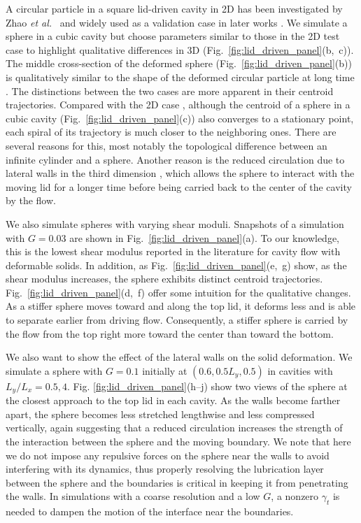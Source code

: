 \documentclass[times, 10pt]{article}
\begin{document}
\begin{multicols}{2}
A circular particle in a square lid-driven cavity in 2D has been investigated by Zhao \textit{et al.}~\cite{zhao08} and widely used as a validation case in later works \cite{sugiyama11, esmailzadeh14, farahbakhsh16, casquero18}.
We simulate a sphere in a cubic cavity but choose parameters similar to those in the 2D test case to highlight qualitative differences in 3D (Fig.~\ref{fig:lid_driven_panel}(b,~c)).
The middle cross-section of the deformed sphere (Fig.~\ref{fig:lid_driven_panel}(b)) is qualitatively similar to the shape of the deformed circular particle at long time \cite{casquero18}.
The distinctions between the two cases are more apparent in their centroid trajectories.
Compared with the 2D case \cite{sugiyama11}, although the centroid of a sphere in a cubic cavity (Fig.~\ref{fig:lid_driven_panel}(c)) also converges to a stationary point, each spiral of its trajectory is much closer to the neighboring ones.
There are several reasons for this, most notably the topological difference between an infinite cylinder and a sphere.
Another reason is the reduced circulation due to lateral walls in the third dimension \cite{gelfgat19},
which allows the sphere to interact with the moving lid for a longer time before being carried back to the center of the cavity by the flow.

We also simulate spheres with varying shear moduli.
Snapshots of a simulation with $G=0.03$ are shown in Fig.~\ref{fig:lid_driven_panel}(a).
To our knowledge, this is the lowest shear modulus reported in the literature for cavity flow with deformable solids.
In addition, as Fig.~\ref{fig:lid_driven_panel}(e,~g) show,
as the shear modulus increases, the sphere exhibits distinct centroid trajectories.
Fig.~\ref{fig:lid_driven_panel}(d,~f) offer some intuition for the qualitative changes.
As a stiffer sphere moves toward and along the top lid,
it deforms less and is able to separate earlier from driving flow.
Consequently, a stiffer sphere is carried by the flow from the top right more toward the center than toward the bottom.

We also want to show the effect of the lateral walls on the solid deformation.
We simulate a sphere with $G=0.1$ initially at $(0.6, 0.5L_y, 0.5)$ in cavities with $L_y/L_x=0.5, 4$.
Fig. \ref{fig:lid_driven_panel}(h--j) show two views of the sphere at the closest approach to the top lid in each cavity.
As the walls become farther apart, the sphere becomes less stretched lengthwise and less compressed vertically,
again suggesting that a reduced circulation increases the strength of the interaction between the sphere and the moving boundary.
%
We note that here we do not impose any repulsive forces on the sphere near the walls to avoid interfering with its dynamics,
thus properly resolving the lubrication layer between the sphere and the boundaries is critical in keeping it from penetrating the walls.
In simulations with a coarse resolution and a low $G$, a nonzero $\gamma_t$ is needed to dampen the motion of the interface near the boundaries.


\end{multicols}
\end{document}
